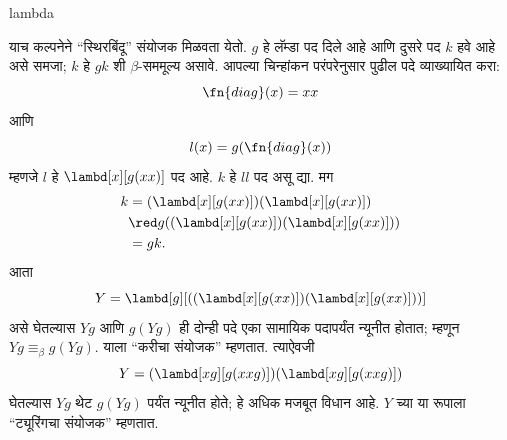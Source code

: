 \documentclass[../../../include/open-logic-section]{subfiles}
\begin{document}
\begin{tagblock}{lambda}
\begin{digress}
याच कल्पनेने ``स्थिरबिंदू'' संयोजक मिळवता येतो. $g$
हे लॅम्डा पद दिले आहे आणि दुसरे पद $k$ हवे आहे असे
समजा; $k$ हे $gk$ शी $\beta$-सममूल्य असावे. आपल्या चिन्हांकन
परंपरेनुसार पुढील पदे व्याख्यायित करा:
\[
\fn{diag}(x) = xx
\]
आणि
\[
l(x) = g(\fn{diag}(x))
\]
म्हणजे $l$ हे $\lambd[x][g(xx)]$ पद आहे. $k$ हे $ll$
पद असू द्या. मग
\begin{align*}
k & = (\lambd[x][g(xx)])(\lambd[x][g(xx)]) \\
& \red  g((\lambd[x][g(xx)])(\lambd[x][g(xx)])) \\
& = gk.
\end{align*}
आता
\[
Y = \lambd[g][((\lambd[x][g(xx)])(\lambd[x][g(xx)]))]
\]
असे घेतल्यास $Yg$ आणि $g(Yg)$ ही दोन्ही पदे एका
सामायिक पदापर्यंत न्यूनीत होतात; म्हणून $Yg \equiv_\beta
g(Yg)$. याला ``करीचा संयोजक'' म्हणतात. त्याऐवजी
\[
Y = (\lambd[xg][g(xxg)])(\lambd[xg][g(xxg)])
\]
घेतल्यास $Yg$ थेट $g(Yg)$ पर्यंत न्यूनीत होते;
हे अधिक मजबूत विधान आहे. $Y$ च्या या रूपाला
``ट्यूरिंगचा संयोजक'' म्हणतात.
\end{digress}
\end{tagblock}
\end{document}
